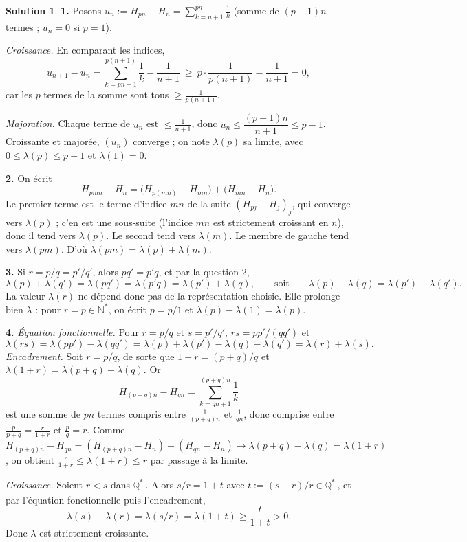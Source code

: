 \documentclass[11pt,a4paper]{article}
\newcommand{\N}{\mathbb{N}}
\newcommand{\Q}{\mathbb{Q}}
\theoremstyle{definition}
\newtheorem*{solution}{Solution}
\begin{document}
\begin{solution}
\noindent\textbf{1.} Posons $u_n:=H_{pn}-H_n=\sum_{k=n+1}^{pn}\frac1k$ (somme de $(p-1)n$ termes ; $u_n=0$ si $p=1$).

\emph{Croissance.} En comparant les indices,
\[
u_{n+1}-u_n=\sum_{k=pn+1}^{p(n+1)}\frac1k-\frac1{n+1}\ \ge\ p\cdot\frac1{p(n+1)}-\frac1{n+1}=0 ,
\]
car les $p$ termes de la somme sont tous $\ge\frac1{p(n+1)}$.

\emph{Majoration.} Chaque terme de $u_n$ est $\le\frac1{n+1}$, donc $u_n\le\dfrac{(p-1)n}{n+1}\le p-1$. Croissante et majorée, $(u_n)$ converge ; on note $\lambda(p)$ sa limite, avec $0\le\lambda(p)\le p-1$ et $\lambda(1)=0$.

\medskip
\noindent\textbf{2.} On écrit
\[
H_{pmn}-H_n=\big(H_{p(mn)}-H_{mn}\big)+\big(H_{mn}-H_n\big).
\]
Le premier terme est le terme d'indice $mn$ de la suite $(H_{pj}-H_j)_j$, qui converge vers $\lambda(p)$ ; c'en est une sous-suite (l'indice $mn$ est strictement croissant en $n$), donc il tend vers $\lambda(p)$. Le second tend vers $\lambda(m)$. Le membre de gauche tend vers $\lambda(pm)$. D'où $\lambda(pm)=\lambda(p)+\lambda(m)$.

\medskip
\noindent\textbf{3.} Si $r=p/q=p'/q'$, alors $pq'=p'q$, et par la question 2,
\[
\lambda(p)+\lambda(q')=\lambda(pq')=\lambda(p'q)=\lambda(p')+\lambda(q),
\qquad\text{soit}\qquad\lambda(p)-\lambda(q)=\lambda(p')-\lambda(q') .
\]
La valeur $\lambda(r)$ ne dépend donc pas de la représentation choisie. Elle prolonge bien $\lambda$ : pour $r=p\in\N^*$, on écrit $p=p/1$ et $\lambda(p)-\lambda(1)=\lambda(p)$.

\medskip
\noindent\textbf{4.} \emph{Équation fonctionnelle.} Pour $r=p/q$ et $s=p'/q'$, $rs=pp'/(qq')$ et
\[
\lambda(rs)=\lambda(pp')-\lambda(qq')=\lambda(p)+\lambda(p')-\lambda(q)-\lambda(q')=\lambda(r)+\lambda(s).
\]
\emph{Encadrement.} Soit $r=p/q$, de sorte que $1+r=(p+q)/q$ et $\lambda(1+r)=\lambda(p+q)-\lambda(q)$. Or
\[
H_{(p+q)n}-H_{qn}=\sum_{k=qn+1}^{(p+q)n}\frac1k
\]
est une somme de $pn$ termes compris entre $\frac1{(p+q)n}$ et $\frac1{qn}$, donc comprise entre $\frac{p}{p+q}=\frac{r}{1+r}$ et $\frac pq=r$. Comme $H_{(p+q)n}-H_{qn}=(H_{(p+q)n}-H_n)-(H_{qn}-H_n)\to\lambda(p+q)-\lambda(q)=\lambda(1+r)$, on obtient $\frac{r}{1+r}\le\lambda(1+r)\le r$ par passage à la limite.

\emph{Croissance.} Soient $r<s$ dans $\Q_+^*$. Alors $s/r=1+t$ avec $t:=(s-r)/r\in\Q_+^*$, et par l'équation fonctionnelle puis l'encadrement,
\[
\lambda(s)-\lambda(r)=\lambda(s/r)=\lambda(1+t)\ge\frac t{1+t}>0 .
\]
Donc $\lambda$ est strictement croissante.


\end{solution}
\end{document}
